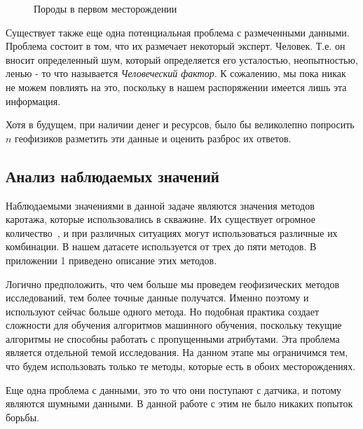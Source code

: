 \documentclass[aps,%
12pt,%
final,%
oneside,
onecolumn,%
musixtex, %
superscriptaddress,%
centertags]{article} %
\begin{document}
\begin{figure}[h!]
\center
  \caption{Породы в первом месторождении}
  \label{lithology-distribution-first}
\end{figure}


Существует также еще одна потенциальная проблема с размеченными данными. Проблема состоит в том, что их размечает некоторый эксперт. Человек. Т.е. он вносит определенный шум, который определяется его усталостью, неопытностью, ленью - то что называется \textit{Человеческий фактор}. К сожалению, мы пока никак не можем повлиять на это, поскольку в нашем распоряжении имеется лишь эта информация.

Хотя в будущем, при наличии денег и ресурсов, было бы великолепно попросить $n$ геофизиков разметить эти данные и оценить разброс их ответов.

\subsection{Анализ наблюдаемых значений}
Наблюдаемыми значениями в данной задаче являются значения методов каротажа, которые использовались в скважине. Их существует огромное количество~\cite{carrot-methods-wiki}, и при различных ситуациях могут использоваться различные их комбинации. В нашем датасете используется от трех до пяти методов. В приложении 1 приведено описание этих методов.

Логично предположить, что чем больше мы проведем геофизических методов исследований, тем более точные данные получатся. Именно поэтому и используют сейчас больше одного метода. Но подобная практика создает сложности для обучения алгоритмов машинного обучения, поскольку текущие алгоритмы не способны работать с пропущенными атрибутами. Эта проблема является отдельной темой исследования. На данном этапе мы ограничимся тем, что будем использовать только те методы, которые есть в обоих месторождениях.

Еще одна проблема с данными, это то что они поступают с датчика, и потому являются шумными данными. В данной работе с этим не было никаких попыток борьбы.
\end{document}
